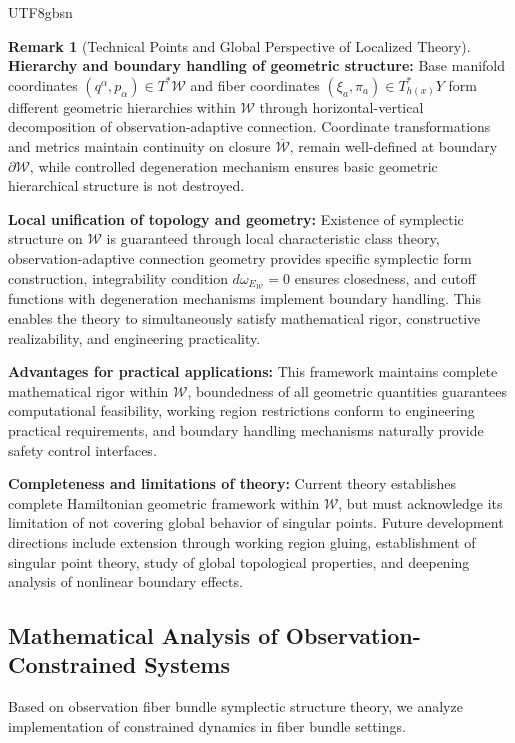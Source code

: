 \documentclass[a4paper,12pt]{extarticle}
\theoremstyle{definition}
\newtheorem{remark}{Remark}
\begin{document}
\begin{CJK}{UTF8}{gbsn}
\begin{remark}[Technical Points and Global Perspective of Localized Theory]
\textbf{Hierarchy and boundary handling of geometric structure:} Base manifold coordinates $(q^\alpha, p_\alpha) \in T^*\mathcal{W}$ and fiber coordinates $(\xi_a, \pi_a) \in T^*_{h(x)}Y$ form different geometric hierarchies within $\mathcal{W}$ through horizontal-vertical decomposition of observation-adaptive connection. Coordinate transformations and metrics maintain continuity on closure $\overline{\mathcal{W}}$, remain well-defined at boundary $\partial \mathcal{W}$, while controlled degeneration mechanism ensures basic geometric hierarchical structure is not destroyed.

\textbf{Local unification of topology and geometry:} Existence of symplectic structure on $\mathcal{W}$ is guaranteed through local characteristic class theory, observation-adaptive connection geometry provides specific symplectic form construction, integrability condition $d\omega_{E_{\mathcal{W}}} = 0$ ensures closedness, and cutoff functions with degeneration mechanisms implement boundary handling. This enables the theory to simultaneously satisfy mathematical rigor, constructive realizability, and engineering practicality.

\textbf{Advantages for practical applications:} This framework maintains complete mathematical rigor within $\mathcal{W}$, boundedness of all geometric quantities guarantees computational feasibility, working region restrictions conform to engineering practical requirements, and boundary handling mechanisms naturally provide safety control interfaces.

\textbf{Completeness and limitations of theory:} Current theory establishes complete Hamiltonian geometric framework within $\mathcal{W}$, but must acknowledge its limitation of not covering global behavior of singular points. Future development directions include extension through working region gluing, establishment of singular point theory, study of global topological properties, and deepening analysis of nonlinear boundary effects.
\end{remark}


\subsection{Mathematical Analysis of Observation-Constrained Systems}

Based on observation fiber bundle symplectic structure theory, we analyze implementation of constrained dynamics in fiber bundle settings.


\end{CJK}
\end{document}
